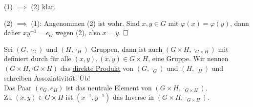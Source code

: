 \documentclass{../../meta/tudscript}
\begin{document}

                (1) $\implies$ (2) klar.

                (2) $\implies$ (1): Angenommen (2) ist wahr. Sind $x,y \in G$ mit $\varphi (x) = \varphi (y)$, dann
                daher $xy^{-1} = e_G$ wegen (2), also $x = y$.
                $\hfill\square$

            Sei $(G, \cdot_G)$ und $(H, \cdot_H)$ Gruppen, dann ist auch $(G \times H, \cdot_{G \times H})$ mit 
            definiert durch
            für alle $(x,y),(\tilde{x}, \tilde{y}) \in G \times H$, eine Gruppe. Wir nennen $(G \times H, \cdot{G \times H})$ das \underline{direkte Produkt}
            von $(G, \cdot_G)$ und $(H, \cdot_H)$ und schreiben
                Assoziativität: Üb!\\
                Das Paar $(e_G, e_H)$ ist das neutrale Element von $(G \times H, \cdot_{G \times H})$.\\
                Zu $(x,y) \in G \times H$ ist $(x^{-1}, y^{-1})$ das Inverse in $(G \times H, \cdot_{G \times H})$.
\end{document}
